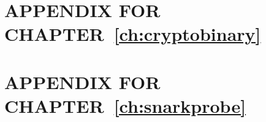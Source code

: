 \chapter{APPENDIX FOR CHAPTER~\ref{ch:cryptobinary}}


\chapter{APPENDIX FOR CHAPTER~\ref{ch:snarkprobe}}

